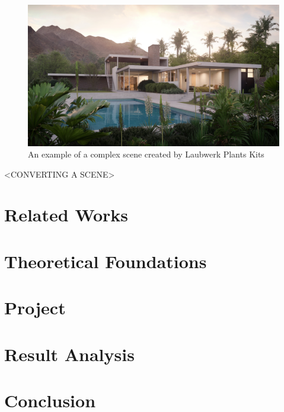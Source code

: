 \documentclass[cic,tc,english]{iiufrgs}
\begin{document}
\begin{figure}[h]
  \includegraphics[width=\textwidth,height=\textheight,keepaspectratio]{../images/1_introduction/Laubwerk-Kit-12_Bauclassroom-Exterior}
  \caption{An example of a complex scene created by Laubwerk Plants Kits}
  \label{fig:intro_complexScene}
\end{figure}

<CONVERTING A SCENE>


\chapter{Related Works}



\chapter{Theoretical Foundations}
\chapter{Project}
\chapter{Result Analysis}
\chapter{Conclusion}




\end{document}
